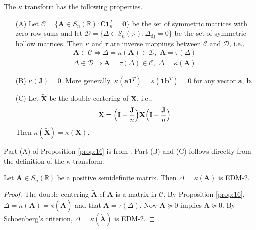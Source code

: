 \begin{proposition}
  \label{prop:16}
  The $\kappa$ transform has the following properties.
  \begin{itemize}
  \item[(A)] Let $\mathcal{C} = \{ \mathbf{A} \in S_n(\mathbb{R}) \colon
    \mathbf{C}\bm{1}_{n}^{T} = \bm{0} \}$ be the set of symmetric
    matrices with zero row sums and let $\mathcal{D} = \{ \Delta \in
    S_n(\mathbb{R}) \colon \Delta_{\mathrm{dg}} = 0 \}$ be the set of
    symmetric hollow matrices. Then $\kappa$ and $\tau$ are inverse
    mappings between $\mathcal{C}$ and $\mathcal{D}$, i.e.,
  \begin{gather}
    \label{eq:55}
    \mathbf{A} \in \mathcal{C}
    \Longrightarrow \Delta = \kappa(\mathbf{A}) \in \mathcal{D}, \,\,
    \mathbf{A} = \tau(\Delta) \\
    \Delta \in \mathcal{D} \Longrightarrow \mathbf{A} = \tau(\Delta)
    \in \mathcal{C}, \,\, \Delta = \kappa(\mathbf{A})
  \end{gather}
  \item[(B)] $\kappa(\mathbf{J}) = 0$. More generally,
    $\kappa(\bm{a}\bm{1}^{T}) = \kappa(\bm{1}\bm{b}^{T}) = 0$
    for any vector $\bm{a}$, $\bm{b}$.
  \item[(C)] Let $\tilde{\mathbf{X}}$ be the double centering of
    $\mathbf{X}$, i.e.,
  \begin{equation}
    \label{eq:71}
    \tilde{\mathbf{X}} = \Bigl(\mathbf{I} - \frac{\mathbf{J}}{n}\Bigr)\mathbf{X} \Bigl(\mathbf{I} - \frac{\mathbf{J}}{n}\Bigr)
  \end{equation}
  Then $\kappa(\tilde{\mathbf{X}}) = \kappa(\mathbf{X})$.
  \end{itemize}
\end{proposition}
Part (A) of Proposition \ref{prop:16} is from
\citep{critchley88:_certain_linear_mappin}. Part (B) and (C)
follows directly from the definition of the $\kappa$ transform. 
\begin{proposition}
  \label{prop:18}
  Let $\mathbf{A} \in S_n(\mathbb{R})$ be a positive semidefinite
  matrix. Then $\Delta = \kappa(\mathbf{A})$ is EDM-2.
\end{proposition}
\begin{proof}
  The double centering $\tilde{\mathbf{A}}$ of $\mathbf{A}$ is a
  matrix in $\mathcal{C}$. By Proposition
  \ref{prop:16}, $\Delta = \kappa(\mathbf{A}) =
  \kappa(\tilde{\mathbf{A}})$ and that $\tilde{\mathbf{A}} =
  \tau(\Delta)$. Now $\mathbf{A} \succeq 0$ implies
  $\tilde{\mathbf{A}} \succeq 0$. By Schoenberg's criterion, $\Delta =
  \kappa(\tilde{\mathbf{A}})$ is EDM-2. 
\end{proof}
%
